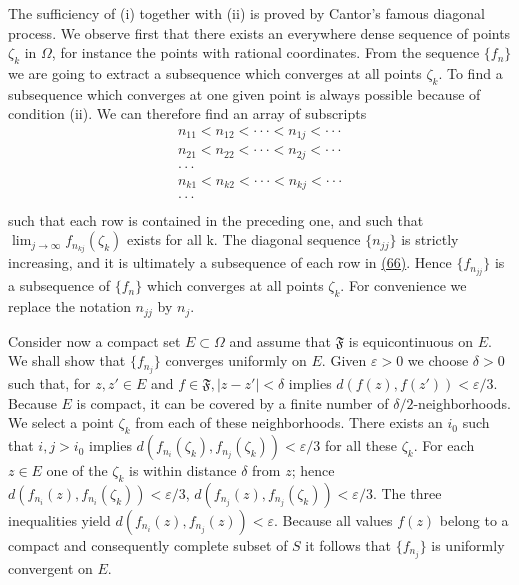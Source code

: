 The sufficiency of (i) together with (ii) is proved by Cantor's famous diagonal process. We observe first that there exists an everywhere dense sequence of points $\zeta_{k}$ in $\Omega$, for instance the points with rational coordinates. From the sequence $\{f_n\}$ we are going to extract a subsequence which converges at all points $\zeta_{k}$. To find a subsequence which converges at one given point is always possible because of condition (ii). We can therefore find an array of subscripts
\begin{equation*}
\begin{array}{l} n _ {1 1} <   n _ {1 2} <   \cdot \cdot \cdot <   n _ {1 j} <   \cdot \cdot \cdot \\ n _ {2 1} <   n _ {2 2} <   \cdot \cdot \cdot <   n _ {2 j} <   \cdot \cdot \cdot \\ \cdot \cdot \cdot \\ n _ {k 1} <   n _ {k 2} <   \cdot \cdot \cdot <   n _ {k j} <   \cdot \cdot \cdot \\ \cdot \cdot \cdot \\ \end{array}\tag{66}\label{eq:5.66}
\end{equation*}
such that each row is contained in the preceding one, and such that $\lim_{j\to\infty}f_{n_{kj}}(\zeta_{k})$ exists for all k. The diagonal sequence $\{n_{jj}\}$ is strictly increasing, and it is ultimately a subsequence of each row in \hyperref[eq:5.66]{(66)}. Hence $\{f_{n_{jj}}\}$ is a subsequence of $\{f_{n}\}$ which converges at all points $\zeta_{k}$. For convenience we replace the notation $n_{jj}$ by $n_{j}$.

Consider now a compact set $E \subset \Omega$ and assume that $\mathfrak{F}$ is equicontinuous on $E$. We shall show that $\{f_{n_j}\}$ converges uniformly on $E$. Given $\varepsilon > 0$ we choose $\delta > 0$ such that, for $z, z' \in E$ and $f \in \mathfrak{F}, |z - z'| < \delta$ implies $d(f(z), f(z')) < \varepsilon/3$. Because $E$ is compact, it can be covered by a finite number of $\delta/2$-neighborhoods. We select a point $\zeta_k$ from each of these neighborhoods. There exists an $i_0$ such that $i,j > i_0$ implies $d(f_{n_i}(\zeta_k), f_{n_j}(\zeta_k)) < \varepsilon/3$ for all these $\zeta_k$. For each $z \in E$ one of the $\zeta_k$ is within distance $\delta$ from $z$; hence $d(f_{n_i}(z), f_{n_i}(\zeta_k)) < \varepsilon/3$, $d(f_{n_j}(z), f_{n_j}(\zeta_k)) < \varepsilon/3$. The three inequalities yield $d(f_{n_i}(z), f_{n_j}(z)) < \varepsilon$. Because all values $f(z)$ belong to a compact and consequently complete subset of $S$ it follows that $\{f_{n_j}\}$ is uniformly convergent on $E$.

